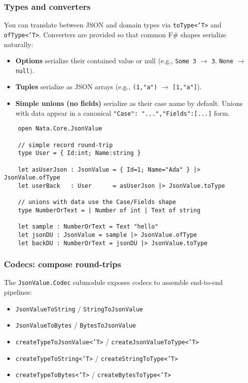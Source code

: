 \documentclass{article}
\begin{document}
\subsubsection{Types and converters}

\noindent You can translate between JSON and domain types via \texttt{toType<'T>} and \texttt{ofType<'T>}. Converters are provided so that common F\# shapes serialize naturally:
\begin{itemize}
  \item \textbf{Options} serialize their contained value or null (e.g., \texttt{Some 3} $\rightarrow$ \texttt{3}, \texttt{None} $\rightarrow$ \texttt{null}).
  \item \textbf{Tuples} serialize as JSON arrays (e.g., \texttt{(1,"a")} $\rightarrow$ \texttt{[1,"a"]}).
  \item \textbf{Simple unions (no fields)} serialize as their case name by default. Unions with data appear in a canonical \texttt{{"Case": "...","Fields":[...]}} form.
\end{itemize}

\begin{verbatim}
    open Nata.Core.JsonValue

    // simple record round-trip
    type User = { Id:int; Name:string }

    let asUserJson : JsonValue = { Id=1; Name="Ada" } |> JsonValue.ofType
    let userBack   : User      = asUserJson |> JsonValue.toType

    // unions with data use the Case/Fields shape
    type NumberOrText = | Number of int | Text of string

    let sample : NumberOrText = Text "hello"
    let jsonDU : JsonValue = sample |> JsonValue.ofType
    let backDU : NumberOrText = jsonDU |> JsonValue.toType
\end{verbatim}

\subsubsection{Codecs: compose round-trips}

\noindent The \texttt{JsonValue.Codec} submodule exposes codecs to assemble end-to-end pipelines:
\begin{itemize}
  \item \texttt{JsonValueToString} / \texttt{StringToJsonValue}
  \item \texttt{JsonValueToBytes}  / \texttt{BytesToJsonValue}
  \item \texttt{createTypeToJsonValue<'T>} / \texttt{createJsonValueToType<'T>}
  \item \texttt{createTypeToString<'T>} / \texttt{createStringToType<'T>}
  \item \texttt{createTypeToBytes<'T>} / \texttt{createBytesToType<'T>}
\end{itemize}
\end{document}
